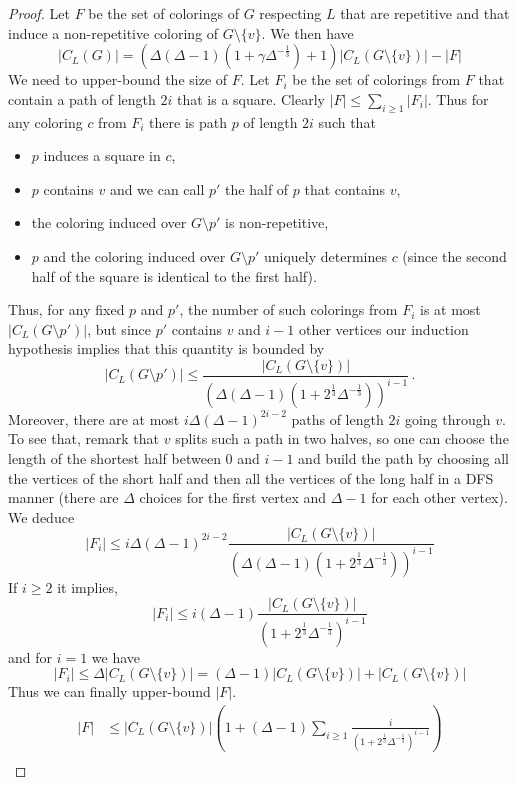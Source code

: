 \documentclass[a4paper,10pt]{article}
\begin{document}
\begin{proof}
 Let $F$ be the set of colorings of $G$  respecting $L$ that are repetitive and
 that induce a non-repetitive coloring of $G\setminus\{v\}$. We then have 
 \begin{equation}\label{maineqFnonrep}
  |C_L(G)|= (\Delta(\Delta-1)(1+ \gamma\Delta^{-\frac{1}{3}})+1)|C_L(G\setminus\{v\})|- |F|
 \end{equation}
We need to upper-bound the size of $F$.
Let $F_i$ be the set of colorings from $F$ that contain a path of length $2i$ that is a square.
Clearly $|F|\le\sum_{i\ge1} |F_i|$.
Thus for any coloring $c$ from $F_i$ there is path $p$ of length $2i$ such that 
\begin{itemize}
 \item $p$ induces a square in $c$,
 \item $p$ contains $v$ and we can call $p'$ the half of $p$ that contains $v$,
 \item the coloring induced over $G\setminus p'$ is non-repetitive,
 \item $p$ and the coloring induced over $G\setminus p'$ uniquely determines $c$ 
 (since the second half of the square is identical to the first half).
\end{itemize}
Thus, for any fixed $p$ and $p'$, the number of such colorings from $F_i$ is at most
$|C_L(G\setminus p')|$, but since $p'$ contains $v$ and $i-1$ other vertices our induction hypothesis implies that this quantity is bounded by
$$|C_L(G\setminus p')|\le \frac{|C_L(G\setminus \{v\})|}{(\Delta(\Delta-1)(1+2^{\frac{1}{3}}\Delta^{-\frac{1}{3}}))^{i-1}}\,.$$
Moreover, there are at most $i\Delta(\Delta-1)^{2i-2}$ paths of length $2i$ going through $v$.
To see that, remark that $v$ splits such a path in two halves, so one can choose the length of the shortest half between $0$ and $i-1$ and build the path by choosing all the vertices of the short half and then all the vertices of the long half in a DFS manner (there are $\Delta$ choices for the first vertex and $\Delta-1$ for each other vertex).
We deduce
$$|F_i|\le i\Delta(\Delta-1)^{2i-2} \frac{|C_L(G\setminus \{v\})|}{(\Delta(\Delta-1)(1+2^{\frac{1}{3}}\Delta^{-\frac{1}{3}}))^{i-1}}$$
If $i\ge2$ it implies, $$|F_i|\le i(\Delta-1) \frac{|C_L(G\setminus \{v\})|}{(1+2^{\frac{1}{3}}\Delta^{-\frac{1}{3}})^{i-1}}$$ 
and for $i=1$ we have 
$$|F_i|\le\Delta|C_L(G\setminus \{v\})| = (\Delta-1)|C_L(G\setminus \{v\})| +|C_L(G\setminus \{v\})|$$
Thus we can finally upper-bound $|F|$.
\begin{align*}
 |F|&\le|C_L(G\setminus \{v\})|\left( 1+(\Delta-1)\sum_{i\ge1}  \frac{i}{(1+2^{\frac{1}{3}}\Delta^{-\frac{1}{3}})^{i-1}}\right)\\

\end{align*}
\end{proof}
\end{document}
